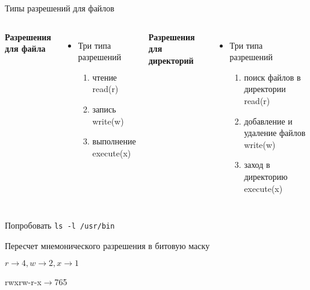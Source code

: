 \documentclass[ignorenonframetext, professionalfonts, hyperref={pdftex, unicode}]{beamer}
\begin{document}
\begin{frame}{Типы разрешений для файлов}
\begin{columns}
\begin{center}
  \textbf{Разрешения для файла}
\end{center}
\begin{itemize}
  \item Три типа разрешений
    \begin{enumerate}
      \item чтение read(r)
      \item запись write(w)
      \item выполнение execute(x)
    \end{enumerate}
\end{itemize}
\begin{center}
  \textbf{Разрешения для директорий}
\end{center}
\begin{itemize}
  \item Три типа разрешений
    \begin{enumerate}
      \item поиск файлов в директории read(r) 
      \item добавление и удаление файлов write(w)
      \item заход в директорию execute(x)
    \end{enumerate}
\end{itemize}
\end{columns}

\pause

Попробовать {\tt ls -l /usr/bin}

\pause

Пересчет мнемонического разрешения в битовую маску 

$r\to4, w\to2 , x\to1$ 

rwxrw-r-x$\to$765
\end{frame}
\end{document}
